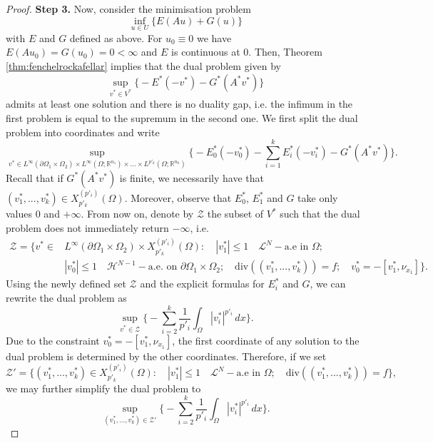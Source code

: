 \documentclass[reqno,12pt]{amsart}
\numberwithin{equation}{section}
\begin{document}
\begin{proof}
{\flushleft \bf Step 3.} Now, consider the minimisation problem
\begin{equation}
\inf_{u \in U} \bigg\{ E(Au) + G(u) \bigg\}
\end{equation}
with $E$ and $G$ defined as above. For $u_0 \equiv 0$ we have $E(Au_0) = G(u_0) = 0 < \infty$ and $E$ is continuous at $0$. Then, Theorem \ref{thm:fenchelrockafellar} implies that the dual problem given by
\begin{equation}
\sup_{v^* \in V^*} \bigg\{ - E^*(-v^*) - G^*(A^* v^*) \bigg\}
\end{equation}
admits at least one solution and there is no duality gap, i.e. the infimum in the first problem is equal to the supremum in the second one. We first split the dual problem into coordinates and write
\begin{equation}
\sup_{v^* \in L^\infty(\partial\Omega_1 \times \Omega_2) \times L^\infty(\Omega; \mathbb{R}^{n_1}) \times ... \times L^{p'_k}(\Omega; \mathbb{R}^{n_k})} \bigg\{ - E_0^*(-v_0^*) - \sum_{i=1}^k E_i^*(-v_i^*) - G^*(A^* v^*) \bigg\}.
\end{equation}
Recall that if $G^*(A^* v^*)$ is finite, we necessarily have that $(v_1^*, ..., v_k^*) \in X_{p'_k}^{(p'_i)}(\Omega)$. Moreover, observe that $E_0^*$, $E_1^*$ and $G$ take only values $0$ and $+\infty$. From now on, denote by $\mathcal{Z}$ the subset of $V^*$ such that the dual problem does not immediately return $-\infty$, i.e.
\begin{align}
\mathcal{Z} = \bigg\{ v^* \in &L^\infty(\partial\Omega_1 \times \Omega_2) \times X_{p'_k}^{(p'_i)}(\Omega): \quad |v_1^*| \leq 1 \quad \mathcal{L}^N-\mbox{a.e in } \Omega; \\
& |v_0^*| \leq 1 \quad \mathcal{H}^{N-1}-\mbox{a.e. on } \partial\Omega_1 \times \Omega_2; \quad \mathrm{div}((v_1^*, ..., v_k^*)) = f; \quad v_0^* = -[v_1^*, \nu_{x_1}] \bigg\}.
\end{align}
Using the newly defined set $\mathcal{Z}$ and the explicit formulas for $E_i^*$ and $G$, we can rewrite the dual problem as
\begin{equation}\label{eq:dualelliptic}
\sup_{v^* \in \mathcal{Z}} \bigg\{ - \sum_{i = 2}^k \frac{1}{p'_i} \int_\Omega |v_i^*|^{p'_i} \, dx \bigg\}.
\end{equation}
Due to the constraint $v_0^* = - [v_1^*, \nu_{x_1}]$, the first coordinate of any solution to the dual problem is determined by the other coordinates. Therefore, if we set
$$
\mathcal{Z}' = \bigg\{ (v_1^*,...,v_k^*) \in  X_{p'_k}^{(p'_i)}(\Omega): \quad |v_1^*| \leq 1 \quad \mathcal{L}^N-\mbox{a.e in } \Omega; \quad \mathrm{div}((v_1^*, ..., v_k^*)) = f \bigg\},
$$
we may further simplify the dual problem to
\begin{equation}\label{eq:simplifieddual}
\sup_{(v_1^*,...,v_k^*) \in \mathcal{Z}'} \bigg\{ - \sum_{i = 2}^k \frac{1}{p'_i} \int_\Omega |v_i^*|^{p'_i} \, dx \bigg\}.
\end{equation}


\end{proof}
\end{document}
